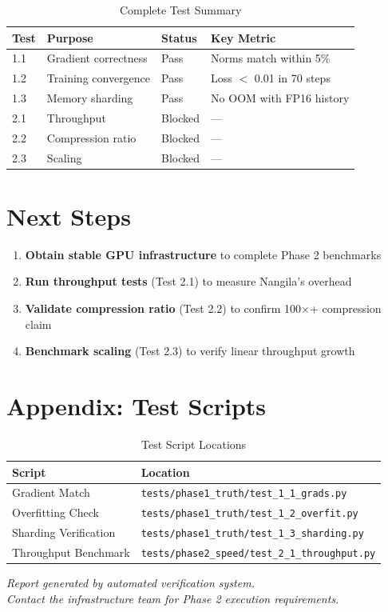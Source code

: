 \documentclass[11pt,a4paper]{article}
\begin{document}
\begin{table}[h]
\centering
\begin{tabular}{@{}llll@{}}
\toprule
\textbf{Test} & \textbf{Purpose} & \textbf{Status} & \textbf{Key Metric} \\
\midrule
1.1 & Gradient correctness & \textcolor{pass}{Pass} & Norms match within 5\% \\
1.2 & Training convergence & \textcolor{pass}{Pass} & Loss $<$ 0.01 in 70 steps \\
1.3 & Memory sharding & \textcolor{pass}{Pass} & No OOM with FP16 history \\
2.1 & Throughput & \textcolor{blocked}{Blocked} & --- \\
2.2 & Compression ratio & \textcolor{blocked}{Blocked} & --- \\
2.3 & Scaling & \textcolor{blocked}{Blocked} & --- \\
\bottomrule
\end{tabular}
\caption{Complete Test Summary}
\end{table}

\section{Next Steps}

\begin{enumerate}
    \item \textbf{Obtain stable GPU infrastructure} to complete Phase 2 benchmarks
    \item \textbf{Run throughput tests} (Test 2.1) to measure Nangila's overhead
    \item \textbf{Validate compression ratio} (Test 2.2) to confirm 100$\times$+ compression claim
    \item \textbf{Benchmark scaling} (Test 2.3) to verify linear throughput growth
\end{enumerate}

\section{Appendix: Test Scripts}

\begin{table}[h]
\centering
\begin{tabular}{@{}ll@{}}
\toprule
\textbf{Script} & \textbf{Location} \\
\midrule
Gradient Match & \texttt{tests/phase1\_truth/test\_1\_1\_grads.py} \\
Overfitting Check & \texttt{tests/phase1\_truth/test\_1\_2\_overfit.py} \\
Sharding Verification & \texttt{tests/phase1\_truth/test\_1\_3\_sharding.py} \\
Throughput Benchmark & \texttt{tests/phase2\_speed/test\_2\_1\_throughput.py} \\
\bottomrule
\end{tabular}
\caption{Test Script Locations}
\end{table}

\vfill

\begin{center}
\textit{Report generated by automated verification system.}\\
\textit{Contact the infrastructure team for Phase 2 execution requirements.}
\end{center}
\end{document}
